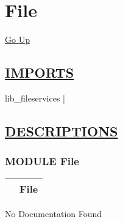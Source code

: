 \chapter*{\color{headfile}
File
}
\hypertarget{ecldoc:toc:File}{}
\hyperlink{ecldoc:toc:root}{Go Up}

\section*{\underline{\textsf{IMPORTS}}}
\begin{doublespace}
{\large
lib\_fileservices |
}
\end{doublespace}

\section*{\underline{\textsf{DESCRIPTIONS}}}
\subsection*{\textsf{\colorbox{headtoc}{\color{white} MODULE}
File}}

\hypertarget{ecldoc:File}{}

{\renewcommand{\arraystretch}{1.5}
\begin{tabularx}{\textwidth}{|>{\raggedright\arraybackslash}l|X|}
\hline
\hspace{0pt}\mytexttt{\color{red} } & \textbf{File} \\
\hline
\end{tabularx}
}

\par





No Documentation Found







